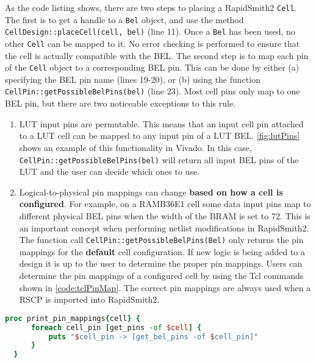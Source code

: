 As the code listing shows, there are two steps to placing a RapidSmith2
\texttt{Cell}. The first is to get a handle to a \texttt{Bel}
object, and use the method \texttt{CellDesign::placeCell(cell, bel)} (line
11). Once a \texttt{Bel} has been used, no other \texttt{Cell} can be mapped to
it. No error checking is performed to ensure that the cell is actually
compatible with the BEL. The second step is to map each pin of the \texttt{Cell}
object to a corresponding BEL pin. This can be done by either (a)
specifying the BEL pin name (lines 19-20), or (b) using the function
\texttt{CellPin::getPossibleBelPins(bel)} (line 23). Most cell pins only map to
one BEL pin, but there are two noticeable exceptions to this rule.

\begin {enumerate}
  \item LUT input pins are permutable. This means that an input cell pin
  attached to a LUT cell can be mapped to any input pin of a LUT BEL.
  \autoref{fig:lutPins} shows an example of this functionality in Vivado. In
  this case,  \texttt{CellPin::get\-PossibleBelPins(bel)} will return
  all input BEL pins of the LUT and the user can decide which ones to
  use.
  
    \item Logical-to-physical pin mappings can change \textbf{based on how a cell
  is configured}. For example, on a RAMB36E1 cell some data input pins map to
  different physical BEL pins when the width of the BRAM is set to 72. This is
  an important concept when performing netlist modifications in RapidSmith2. The
  function call \texttt{CellPin::get\-PossibleBelPins(Bel)} only returns the pin
  mappings for the \textbf{default} cell configuration. If new logic is being
  added to a design it is up to the user to determine the proper pin mappings. 
  Users can determine the pin mappings of a configured cell by using the Tcl
  commands shown in \autoref{code:tclPinMap}. The correct pin mappings are
  always used when a RSCP is imported into RapidSmith2.

\end{enumerate}

\newpage
  \begin{lstlisting}[xleftmargin=1.5em, framexleftmargin=1.5em, language=tcl,
caption=Tcl script to print all logical-to-physical pin mappings of a
cell,label=code:tclPinMap] 
  proc print_pin_mappings{cell} {
	  foreach cell_pin [get_pins -of $cell] {
		  puts "$cell_pin -> [get_bel_pins -of $cell_pin]" 
	  }
  }
\end{lstlisting}
 

